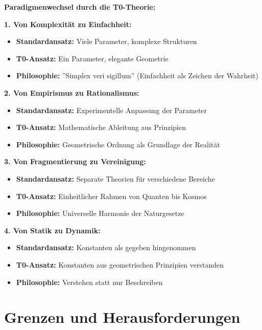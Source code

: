 \documentclass[12pt,a4paper]{article}
\begin{document}
	\begin{foundation}
		\textbf{Paradigmenwechsel durch die T0-Theorie:}
		
		\textbf{1. Von Komplexität zu Einfachheit:}
		\begin{itemize}
			\item \textbf{Standardansatz:} Viele Parameter, komplexe Strukturen
			\item \textbf{T0-Ansatz:} Ein Parameter, elegante Geometrie
			\item \textbf{Philosophie:} ''Simplex veri sigillum'' (Einfachheit als Zeichen der Wahrheit)
		\end{itemize}
		
		\textbf{2. Von Empirismus zu Rationalismus:}
		\begin{itemize}
			\item \textbf{Standardansatz:} Experimentelle Anpassung der Parameter
			\item \textbf{T0-Ansatz:} Mathematische Ableitung aus Prinzipien
			\item \textbf{Philosophie:} Geometrische Ordnung als Grundlage der Realität
		\end{itemize}
		
		\textbf{3. Von Fragmentierung zu Vereinigung:}
		\begin{itemize}
			\item \textbf{Standardansatz:} Separate Theorien für verschiedene Bereiche
			\item \textbf{T0-Ansatz:} Einheitlicher Rahmen von Quanten bis Kosmos
			\item \textbf{Philosophie:} Universelle Harmonie der Naturgesetze
		\end{itemize}
		
		\textbf{4. Von Statik zu Dynamik:}
		\begin{itemize}
			\item \textbf{Standardansatz:} Konstanten als gegeben hingenommen
			\item \textbf{T0-Ansatz:} Konstanten aus geometrischen Prinzipien verstanden
			\item \textbf{Philosophie:} Verstehen statt nur Beschreiben
		\end{itemize}
	\end{foundation}
	
	\section{Grenzen und Herausforderungen}
	
\end{document}
